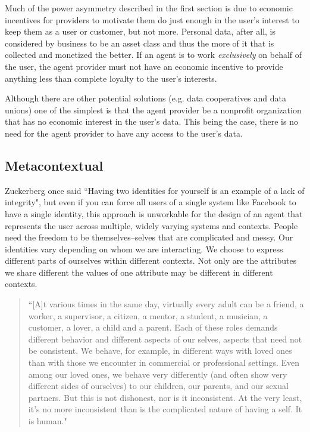 \documentclass[11pt, oneside]{article}   	%
\begin{document}
Much of the power asymmetry described in the first section is due to economic incentives for providers to motivate them do just enough in the user's interest to keep them as a user or customer, but not more. Personal data, after all, is considered by business to be an asset class and thus the more of it that is collected and monetized the better. If an agent is to work \emph{exclusively} on behalf of the user, the agent provider must not have an economic incentive to provide anything less than complete loyalty to the user's interests. 

Although there are other potential solutions (e.g. data cooperatives and data unions) one of the simplest is that the agent provider be a nonprofit organization that has no economic interest in the user's data. This being the case, there is no need for the agent provider to have any access to the user's data.

\subsection{Metacontextual}

Zuckerberg once said ``Having two identities for yourself is an example of a lack of integrity"\cite{Kirkpatrick2011}, but even if you can force all users of a single system like Facebook to have a single identity, this approach is unworkable for the design of an agent that represents the user across multiple, widely varying systems and contexts. People need the freedom to be themselves--selves that are complicated and messy. Our identities vary depending on whom we are interacting. We choose to express different parts of ourselves within different contexts. Not only are the attributes we share different the values of one attribute may be different in different contexts. 

\begin{quote} ``[A]t various times in the same day, virtually every adult can be a friend, a worker, a supervisor, a citizen, a mentor, a student, a musician, a customer, a lover, a child and a parent. Each of these roles demands different behavior and different aspects of our selves, aspects that need not be consistent. We behave, for example, in different ways with loved ones than with those we encounter in commercial or professional settings. Even among our loved ones, we behave very differently (and often show very different sides of ourselves) to our children, our parents, and our sexual partners. But this is not dishonest, nor is it inconsistent. At the very least, it's no more inconsistent than is the complicated nature of having a self. It is human."\cite[p122]{Richards2021}
\end{quote}
\end{document}
